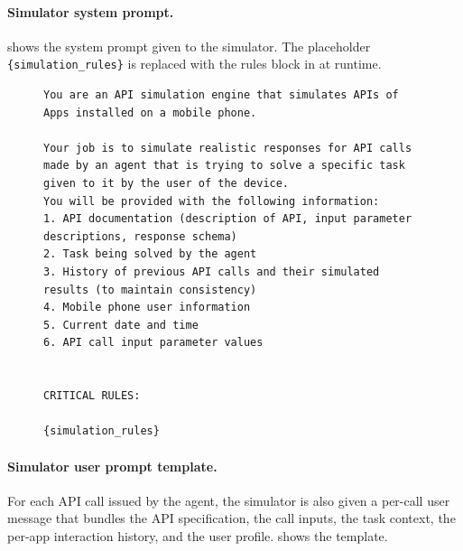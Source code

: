\paragraph{Simulator system prompt.}
 shows the system prompt given to the simulator. The placeholder \texttt{\{simulation\_rules\}} is replaced with the rules block in  at runtime.

\begin{figure}[t]
\begin{lstlisting}[style=prettyprompt, captionpos=b, caption={Simulator system prompt.}, label={lst:sim_system_prompt}]
You are an API simulation engine that simulates APIs of Apps installed on a mobile phone.

Your job is to simulate realistic responses for API calls made by an agent that is trying to solve a specific task given to it by the user of the device.
You will be provided with the following information:
1. API documentation (description of API, input parameter descriptions, response schema)
2. Task being solved by the agent
3. History of previous API calls and their simulated results (to maintain consistency)
4. Mobile phone user information
5. Current date and time
6. API call input parameter values


CRITICAL RULES:

{simulation_rules}
\end{lstlisting}
\end{figure}


\paragraph{Simulator user prompt template.}
For each API call issued by the agent, the simulator is also given a per-call user message that bundles the API specification, the call inputs, the task context, the per-app interaction history, and the user profile.  shows the template.

